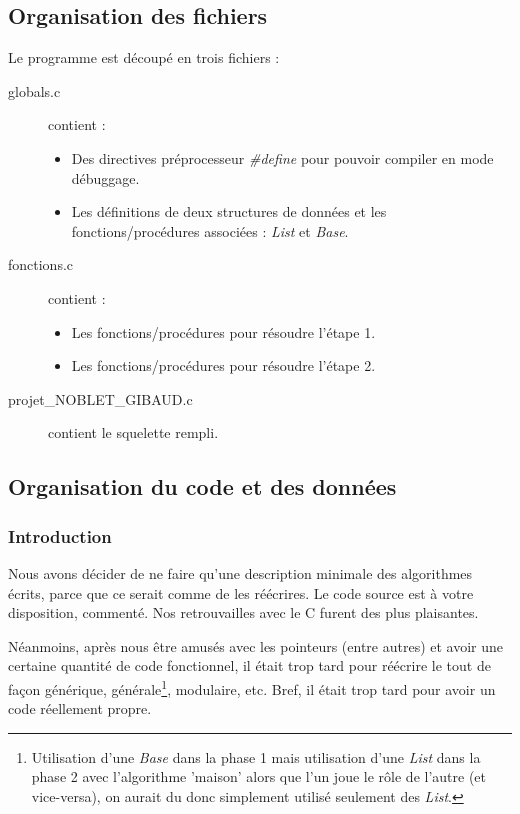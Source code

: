 \documentclass[a4paper,10pt]{article}
\begin{document}
\subsection{Organisation des fichiers}
Le programme est découpé en trois fichiers :
\begin{description}
\item[globals.c] contient :
  \begin{itemize}
  \item Des directives préprocesseur \emph{\#define} pour pouvoir compiler en mode débuggage.
  \item Les définitions de deux structures de données et les fonctions/procédures associées : \emph{List} et \emph{Base}.
  \end{itemize}
\item[fonctions.c] contient :
  \begin{itemize}
  \item Les fonctions/procédures pour résoudre l'étape 1.
  \item Les fonctions/procédures pour résoudre l'étape 2.
  \end{itemize}
\item[projet\_NOBLET\_GIBAUD.c] contient le squelette rempli.
\end{description}
    
\subsection{Organisation du code et des données}

\subsubsection{Introduction}
Nous avons décider de ne faire qu'une description minimale des algorithmes écrits,
parce que ce serait comme de les réécrires.
Le code source est à votre disposition, commenté.
Nos retrouvailles avec le C furent des plus plaisantes.

Néanmoins, après nous être amusés avec les pointeurs (entre autres) et avoir une certaine quantité de code fonctionnel,
il était trop tard pour réécrire le tout de façon générique,
générale\footnote{Utilisation d'une \emph{Base} dans la phase 1 mais utilisation d'une \emph{List} dans la phase 2
  avec l'algorithme 'maison' alors que l'un joue le rôle de l'autre (et vice-versa), on aurait du donc simplement
  utilisé seulement des \emph{List}.}, modulaire, etc. Bref, il était trop tard pour avoir un code réellement propre.
\end{document}
